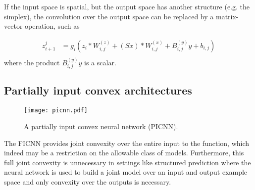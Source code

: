 If the input space is spatial, but the output space has another structure
(e.g. the simplex), the convolution over the output space can
be replaced by a matrix-vector operation, such as

\begin{equation}
\begin{split}
z_{i+1}^j & = g_i\left(z_i\ast W_{i,j}^{(z)} + (Sx)\ast W_{i,j}^{(x)} + B_{i,j}^{(y)}y + b_{i,j} \right) \\
\end{split}
\end{equation}
where the product $B_{i,j}^{(y)}y$ is a scalar.


\subsection{Partially input convex architectures}\label{sec:icnn:picnn}
\begin{figure}[t]
  \centering
  \texttt{[image: picnn.pdf]}
  \caption{A partially input convex neural network (PICNN).}
  \label{fig:picnn}
\end{figure}
The FICNN provides joint convexity over the entire input to the function, which
indeed may
be a restriction on the allowable class of models.  Furthermore, this full joint
convexity is unnecessary in settings like structured prediction where the neural
network is used to build a joint model over an input and output example space
and only convexity over the outputs is necessary.

